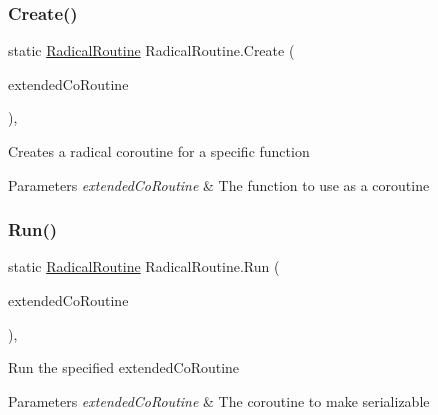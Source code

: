 \subsubsection{\texorpdfstring{Create()}{Create()}}
{\footnotesize\ttfamily static \hyperlink{class_radical_routine}{Radical\+Routine} Radical\+Routine.\+Create (\begin{DoxyParamCaption}\item[{I\+Enumerator}]{extended\+Co\+Routine }\end{DoxyParamCaption})\hspace{0.3cm}{\ttfamily [inline]}, {\ttfamily [static]}}



Creates a radical coroutine for a specific function 


\begin{DoxyParams}{Parameters}
{\em extended\+Co\+Routine} & The function to use as a coroutine \\
\hline
\end{DoxyParams}
\mbox{\label{class_radical_routine_a548acf1cd3335a543c8014a87d2fa26b}} 
\subsubsection{\texorpdfstring{Run()}{Run()}\hspace{0.1cm}{\footnotesize\ttfamily [1/5]}}
{\footnotesize\ttfamily static \hyperlink{class_radical_routine}{Radical\+Routine} Radical\+Routine.\+Run (\begin{DoxyParamCaption}\item[{I\+Enumerator}]{extended\+Co\+Routine }\end{DoxyParamCaption})\hspace{0.3cm}{\ttfamily [inline]}, {\ttfamily [static]}}



Run the specified extended\+Co\+Routine 


\begin{DoxyParams}{Parameters}
{\em extended\+Co\+Routine} & The coroutine to make serializable \\
\hline
\end{DoxyParams}
\mbox{\label{class_radical_routine_ac64373a158f06b92f5d1c0052a49c3b6}} 
